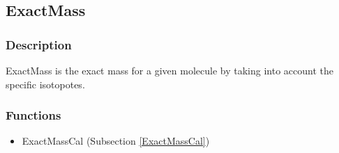 \subsection{ExactMass}\label{ExactMass}
\subsubsection{Description}
ExactMass is the exact mass for a given molecule by taking into account the specific isotopotes.
\subsubsection{Functions}
\begin{itemize}
\item ExactMassCal (Subsection \ref{ExactMassCal})
\end{itemize}

